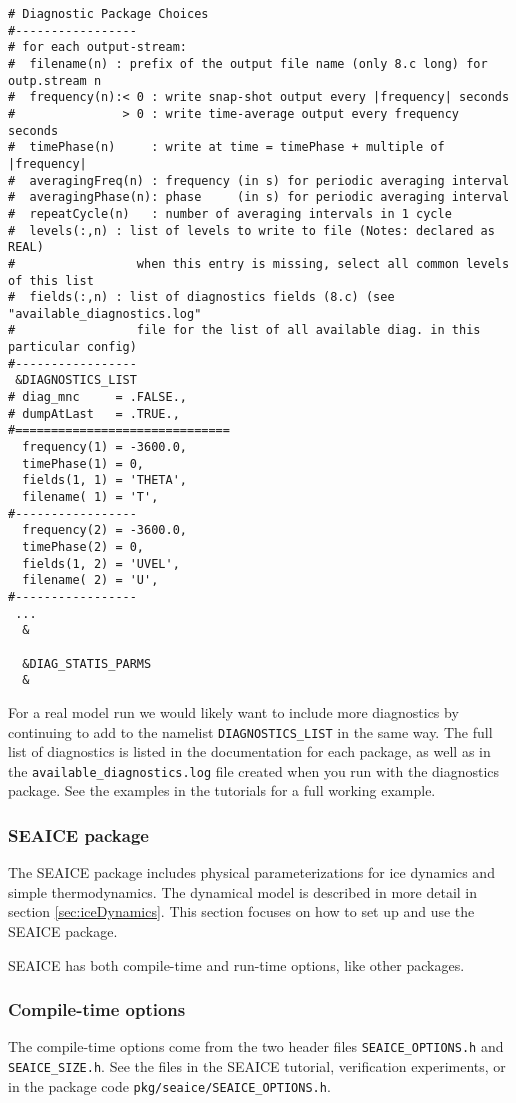 \documentclass[11pt]{article}
\begin{document}
\begin{lstlisting}[caption={Example \texttt{data.diagnostics} file}, captionpos=b]
# Diagnostic Package Choices
#-----------------
# for each output-stream:
#  filename(n) : prefix of the output file name (only 8.c long) for outp.stream n
#  frequency(n):< 0 : write snap-shot output every |frequency| seconds
#               > 0 : write time-average output every frequency seconds
#  timePhase(n)     : write at time = timePhase + multiple of |frequency|
#  averagingFreq(n) : frequency (in s) for periodic averaging interval
#  averagingPhase(n): phase     (in s) for periodic averaging interval
#  repeatCycle(n)   : number of averaging intervals in 1 cycle
#  levels(:,n) : list of levels to write to file (Notes: declared as REAL)
#                 when this entry is missing, select all common levels of this list
#  fields(:,n) : list of diagnostics fields (8.c) (see "available_diagnostics.log"
#                 file for the list of all available diag. in this particular config)
#-----------------
 &DIAGNOSTICS_LIST
# diag_mnc     = .FALSE.,
# dumpAtLast   = .TRUE.,
#==============================
  frequency(1) = -3600.0,
  timePhase(1) = 0,
  fields(1, 1) = 'THETA',
  filename( 1) = 'T',
#-----------------
  frequency(2) = -3600.0,
  timePhase(2) = 0,
  fields(1, 2) = 'UVEL',
  filename( 2) = 'U',
#-----------------
 ...
  &

  &DIAG_STATIS_PARMS
  &
\end{lstlisting}
For a real model run we would likely want to include more diagnostics by continuing to add to the namelist \verb|DIAGNOSTICS_LIST| in the same way. The full list of diagnostics is listed in the documentation for each package, as well as in the \verb|available_diagnostics.log| file created when you run with the diagnostics package. See the examples in the tutorials for a full working example.

\subsubsection{SEAICE package}
\label{sec:SEAICE}
The SEAICE package includes physical parameterizations for ice dynamics and simple thermodynamics. The dynamical model is described in more detail in section \ref{sec:iceDynamics}. This section focuses on how to set up and use the SEAICE package.

SEAICE has both compile-time and run-time options, like other packages.

\subsubsection*{Compile-time options}
The compile-time options come from the two header files \verb|SEAICE_OPTIONS.h| and \verb|SEAICE_SIZE.h|. See the files in the SEAICE tutorial, verification experiments, or in the package code \verb|pkg/seaice/SEAICE_OPTIONS.h|.
\end{document}
